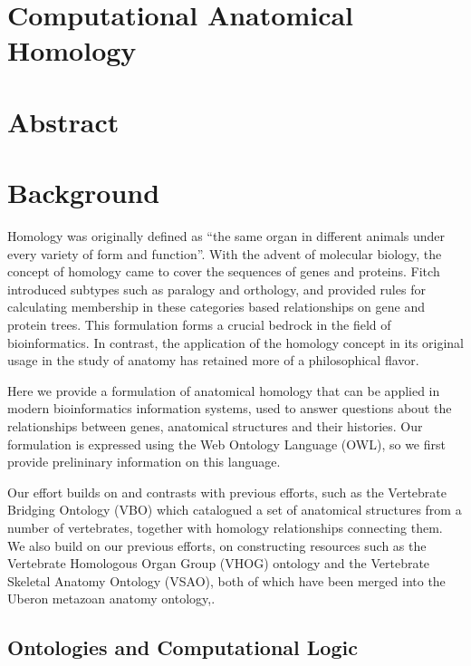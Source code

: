 \section{Computational Anatomical
Homology}\label{computational-anatomical-homology}

\section{Abstract}\label{abstract}

\section{Background}\label{background}

Homology was originally defined as ``the same organ in different animals
under every variety of form and function''\cite{Owen1843}. With the
advent of molecular biology, the concept of homology came to cover the
sequences of genes and proteins. Fitch introduced subtypes such as
paralogy and orthology, and provided rules for calculating membership in
these categories based relationships on gene and protein
trees\cite{Fitch1970}. This formulation forms a crucial bedrock in the
field of bioinformatics. In contrast, the application of the homology
concept in its original usage in the study of anatomy has retained more
of a philosophical flavor.

Here we provide a formulation of anatomical homology that can be applied
in modern bioinformatics information systems, used to answer questions
about the relationships between genes, anatomical structures and their
histories. Our formulation is expressed using the Web Ontology Language
(OWL), so we first provide prelininary information on this language.

Our effort builds on and contrasts with previous efforts, such as the
Vertebrate Bridging Ontology (VBO) which catalogued a set of anatomical
structures from a number of vertebrates, together with homology
relationships connecting them. We also build on our previous efforts, on
constructing resources such as the Vertebrate Homologous Organ Group
(VHOG) ontology\cite{Bgee} and the Vertebrate Skeletal Anatomy Ontology
(VSAO)\cite{Dahdul}, both of which have been merged into the Uberon
metazoan anatomy ontology\cite{Mungall2012},\cite{Haendel2014}.

\subsection{Ontologies and Computational
Logic}\label{ontologies-and-computational-logic}

